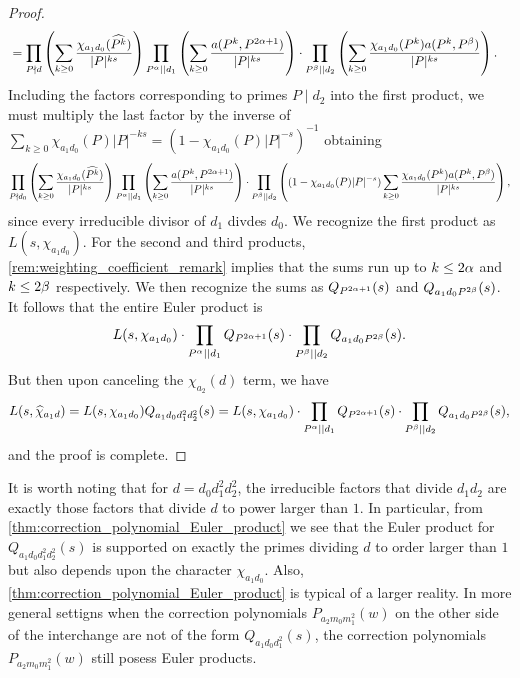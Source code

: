 \documentclass[12pt,reqno,oneside]{amsart}
\begin{document}
\begin{proof}
\begin{align*}
            &= \prod_{P \nmid d}\left(\sum_{k \ge 0}\frac{\chi_{a_{1}d_{0}}(\widehat{P^{k}})}{|P|^{ks}}\right)\prod_{P^{\alpha} \mid\mid d_{1}}\left(\sum_{k \ge 0}\frac{a(P^{k},P^{2\alpha+1})}{|P|^{ks}}\right) \cdot \prod_{P^{\beta} \mid\mid d_{2}}\left(\sum_{k \ge 0}\frac{\chi_{a_{1}d_{0}}(P^{k})a(P^{k},P^{\beta})}{|P|^{ks}}\right).
        \end{align*}
        Including the factors corresponding to primes $P \mid d_{2}$ into the first product, we must multiply the last factor by the inverse of $\sum_{k \ge 0}\chi_{a_{1}d_{0}}(P)|P|^{-ks} = (1-\chi_{a_{1}d_{0}}(P)|P|^{-s})^{-1}$ obtaining
        \[
            \prod_{P \nmid d_{0}}\left(\sum_{k \ge 0}\frac{\chi_{a_{1}d_{0}}(\widehat{P^{k}})}{|P|^{ks}}\right)\prod_{P^{\alpha} \mid\mid d_{1}}\left(\sum_{k \ge 0}\frac{a(P^{k},P^{2\alpha+1})}{|P|^{ks}}\right) \cdot \prod_{P^{\beta} \mid\mid d_{2}}\left((1-\chi_{a_{1}d_{0}}(P)|P|^{-s})\sum_{k \ge 0}\frac{\chi_{a_{1}d_{0}}(P^{k})a(P^{k},P^{\beta})}{|P|^{ks}}\right),
        \]
        since every irreducible divisor of $d_{1}$ divdes $d_{0}$. We recognize the first product as $L(s,\chi_{a_{1}d_{0}})$. For the second and third products, \cref{rem:weighting_coefficient_remark} implies that the sums run up to $k \le 2\alpha$ and $k \le 2\beta$ respectively. We then recognize the sums as $Q_{P^{2\alpha+1}}(s)$ and $Q_{a_{1}d_{0}P^{2\beta}}(s)$. It follows that the entire Euler product is
        \[
            L(s,\chi_{a_{1}d_{0}}) \cdot \prod_{P^{\alpha} \mid\mid d_{1}}Q_{P^{2\alpha+1}}(s) \cdot \prod_{P^{\beta} \mid\mid d_{2}}Q_{a_{1}d_{0}P^{2\beta}}(s).
        \]
        But then upon canceling the $\chi_{a_{2}}(d)$ term, we have
        \[
            L(s,\widehat{\chi}_{a_{1}d}) = L(s,\chi_{a_{1}d_{0}})Q_{a_{1}d_{0}d_{1}^{2}d_{2}^{2}}(s) = L(s,\chi_{a_{1}d_{0}}) \cdot \prod_{P^{\alpha} \mid\mid d_{1}}Q_{P^{2\alpha+1}}(s) \cdot \prod_{P^{\beta} \mid\mid d_{2}}Q_{a_{1}d_{0}P^{2\beta}}(s),
        \]
        and the proof is complete.
    \end{proof}

    It is worth noting that for $d = d_{0}d_{1}^{2}d_{2}^{2}$, the irreducible factors that divide $d_{1}d_{2}$ are exactly those factors that divide $d$ to power larger than $1$. In particular, from \cref{thm:correction_polynomial_Euler_product} we see that the Euler product for $Q_{a_{1}d_{0}d_{1}^{2}d_{2}^{2}}(s)$ is supported on exactly the primes dividing $d$ to order larger than $1$ but also depends upon the character $\chi_{a_{1}d_{0}}$. Also, \cref{thm:correction_polynomial_Euler_product} is typical of a larger reality. In more general settigns when the correction polynomials $P_{a_{2}m_{0}m_{1}^{2}}(w)$ on the other side of the interchange are not of the form $Q_{a_{1}d_{0}d_{1}^{2}}(s)$, the correction polynomials $P_{a_{2}m_{0}m_{1}^{2}}(w)$ still posess Euler products.
\end{document}

